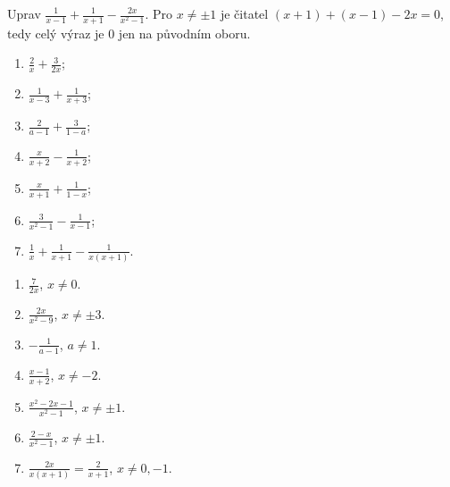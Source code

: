\documentclass[11pt,a4paper]{article}
\begin{document}
\begin{zadaniReseniBox}[breakable=false,title={Rozšíření 1}]
Uprav $\displaystyle\frac1{x-1}+\frac1{x+1}-\frac{2x}{x^2-1}$.
\tcblower
Pro $x\ne\pm1$ je čitatel $(x+1)+(x-1)-2x=0$, tedy celý výraz je $0$ jen na původním oboru.
\end{zadaniReseniBox}
\begin{zadaniReseniBox}[breakable=false,title={Domácí úkol}]
\begin{enumerate}[label=\alph*)]
\item $\frac2x+\frac3{2x}$;
\item $\frac1{x-3}+\frac1{x+3}$;
\item $\frac2{a-1}+\frac3{1-a}$;
\item $\frac{x}{x+2}-\frac1{x+2}$;
\item $\frac{x}{x+1}+\frac1{1-x}$;
\item $\frac3{x^2-1}-\frac1{x-1}$;
\item $\frac1x+\frac1{x+1}-\frac1{x(x+1)}$.
\end{enumerate}
\tcblower
\begin{enumerate}[label=\alph*)]
\item $\frac7{2x}$, $x\ne0$.
\item $\frac{2x}{x^2-9}$, $x\ne\pm3$.
\item $-\frac1{a-1}$, $a\ne1$.
\item $\frac{x-1}{x+2}$, $x\ne-2$.
\item $\frac{x^2-2x-1}{x^2-1}$, $x\ne\pm1$.
\item $\frac{2-x}{x^2-1}$, $x\ne\pm1$.
\item $\frac{2x}{x(x+1)}=\frac2{x+1}$, $x\ne0,-1$.
\end{enumerate}
\end{zadaniReseniBox}
\end{document}
